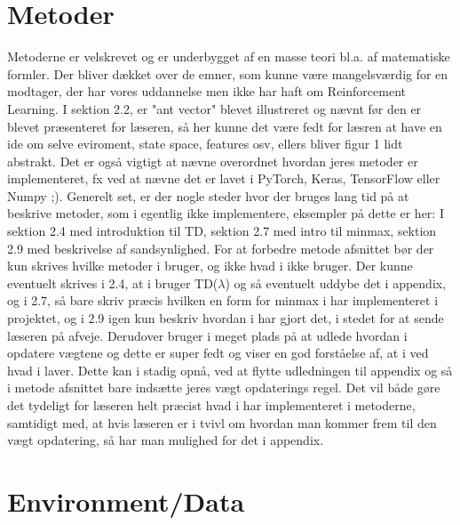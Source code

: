 \documentclass[11pt, fleqn, titlepage]{article}
\begin{document}
	\section*{Metoder}
	Metoderne er velskrevet og er underbygget af en masse teori bl.a. af matematiske formler. Der bliver dækket over de emner, som kunne være mangelsværdig for en modtager, der har vores uddannelse men ikke har haft om Reinforcement Learning. I sektion 2.2, er "ant vector" blevet illustreret og nævnt før den er blevet præsenteret for læseren, så her kunne det være fedt for læsren at have en ide om selve eviroment, state space, features osv, ellers bliver figur 1 lidt abstrakt. Det er også vigtigt at nævne overordnet hvordan jeres metoder er implementeret, fx ved at nævne det er lavet i PyTorch, Keras, TensorFlow eller Numpy ;). Generelt set, er der nogle steder hvor der bruges lang tid på at beskrive metoder, som i egentlig ikke implementere, eksempler på dette er her: I sektion 2.4 med introduktion til TD, sektion 2.7 med intro til minmax, sektion 2.9 med beskrivelse af sandsynlighed. For at forbedre metode afsnittet bør der kun skrives hvilke metoder i bruger, og ikke hvad i ikke bruger. Der kunne eventuelt skrives i 2.4, at i bruger TD($\lambda$) og så eventuelt uddybe det i appendix, og i 2.7, så bare skriv præcis hvilken en form for minmax i har implementeret i projektet, og i 2.9 igen kun beskriv hvordan i har gjort det, i stedet for at sende læseren på afveje. Derudover bruger i meget plads på at udlede hvordan i opdatere vægtene og dette er super fedt og viser en god forståelse af, at i ved hvad i laver. Dette kan i stadig opnå, ved at flytte udledningen til appendix og så i metode afsnittet bare indsætte jeres vægt opdaterings regel. Det vil både gøre det tydeligt for læseren helt præcist hvad i har implementeret i metoderne, samtidigt med, at hvis læseren er i tvivl om hvordan man kommer frem til den vægt opdatering, så har man mulighed for det i appendix. 
	
	\section*{Environment/Data}
	
\end{document}
